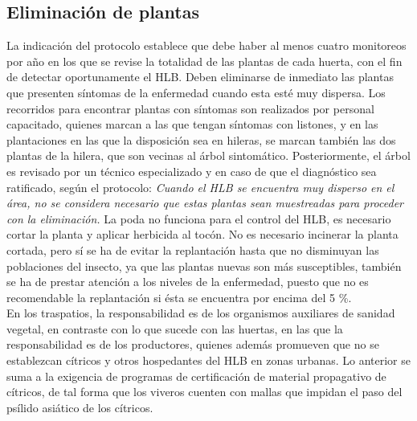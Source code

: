 \subsection{Eliminación de plantas}%

La indicación del protocolo establece que debe haber al menos cuatro monitoreos por año en los que se revise la totalidad de las plantas de cada huerta, con el fin de detectar oportunamente el HLB. Deben eliminarse de inmediato las plantas que presenten síntomas de la enfermedad cuando esta esté muy dispersa. Los recorridos para encontrar plantas con síntomas son realizados por personal capacitado, quienes marcan a las que tengan síntomas con listones, y en las plantaciones en las que la disposición sea en hileras, se marcan también las dos plantas de la hilera, que son vecinas al árbol sintomático. Posteriormente, el árbol es revisado por un técnico especializado y en caso de que el diagnóstico sea ratificado, según el protocolo: \textit{Cuando el HLB se encuentra muy disperso en el área, no se considera necesario que estas plantas sean muestreadas para proceder con la eliminación.} La poda no funciona para el control del HLB, es necesario cortar la planta y aplicar herbicida al tocón. No es necesario incinerar la planta cortada, pero sí se ha de evitar la replantación hasta que no disminuyan las poblaciones del insecto, ya que las plantas nuevas son más susceptibles, también se ha de prestar atención a los niveles de la enfermedad, puesto que no es recomendable la replantación si ésta se encuentra por encima del 5 \%.\\
En los traspatios, la responsabilidad es de los organismos auxiliares de sanidad vegetal, en contraste con lo que sucede con las huertas, en las que la responsabilidad es de los productores, quienes además promueven que no se establezcan cítricos y otros hospedantes del HLB en zonas urbanas. Lo anterior se suma a la exigencia de programas de certificación de material propagativo de cítricos, de tal forma que los viveros cuenten con mallas que impidan el paso del psílido asiático de los cítricos.


